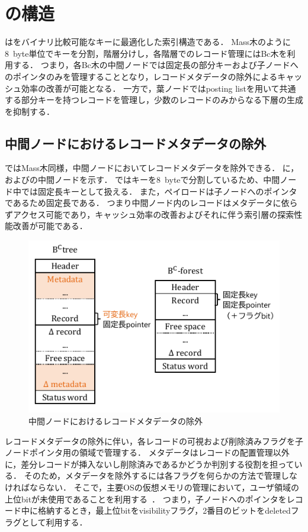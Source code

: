 \section{\Bcforest{}の構造}
\label{sec:bc_forest_structure}

\Bcforest{}は\Bctree{}をバイナリ比較可能なキーに最適化した索引構造である．
Mass木のように8~byte単位でキーを分割，階層分けし，各階層でのレコード管理にはBc木を利用する．
つまり，各Bc木の中間ノードでは固定長の部分キーおよび子ノードへのポインタのみを管理することとなり，レコードメタデータの除外によるキャッシュ効率の改善が可能となる．
一方で，葉ノードではposting listを用いて共通する部分キーを持つレコードを管理し，少数のレコードのみからなる下層の生成を抑制する．

\subsection{中間ノードにおけるレコードメタデータの除外}
\Bcforest{}ではMass木同様，中間ノードにおいてレコードメタデータを除外できる．
\Fig{\ref{fig:inner}}に，\Bctree{}および\Bcforest{}の中間ノードを示す．
\Bcforest{}ではキーを8~byteで分割しているため、中間ノード中では固定長キーとして扱える．
また，ペイロードは子ノードへのポインタであるため固定長である．
つまり中間ノード内のレコードはメタデータに依らずアクセス可能であり，キャッシュ効率の改善およびそれに伴う索引層の探索性能改善が可能である．

\begin{figure}[t]
    \centering
    \includegraphics{./figures/inner_node.pdf}
    \caption{\Bcforest{}中間ノードにおけるレコードメタデータの除外}
    \label{fig:inner}
\end{figure}

レコードメタデータの除外に伴い，各レコードの可視および削除済みフラグを子ノードポインタ用の領域で管理する．
メタデータはレコードの配置管理以外に，差分レコードが挿入ないし削除済みであるかどうか判別する役割を担っている．
そのため，メタデータを除外するには各フラグを何らかの方法で管理しなければならない．
そこで，主要OSの仮想メモリの管理において，ユーザ領域の上位bitが未使用であることを利用する~\cite{url:Linux}．
つまり，子ノードへのポインタをレコード中に格納するとき，最上位bitをvisibilityフラグ，2番目のビットをdeletedフラグとして利用する．

